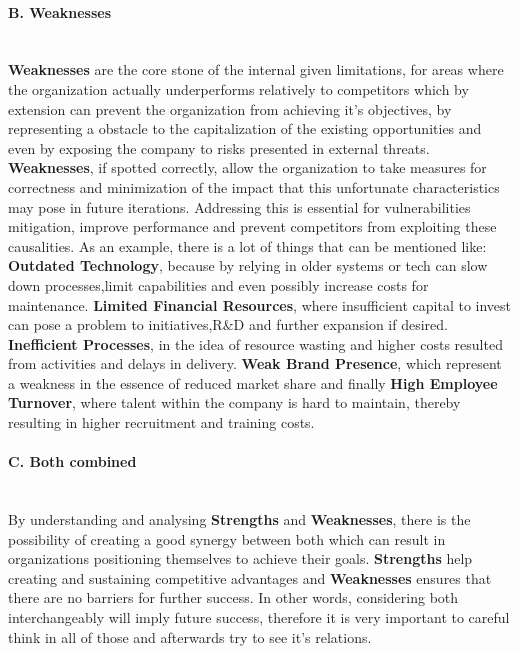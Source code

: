 \paragraph{B. Weaknesses}\mbox{}\\
\textbf{Weaknesses} are the core stone of the internal given limitations, for areas where the organization actually underperforms 
relatively to competitors which by extension can prevent the organization from achieving it's objectives, by representing a obstacle to 
the capitalization of the existing opportunities and even  by exposing the company to risks presented in external threats. \textbf{Weaknesses}, 
if spotted correctly, allow the organization to take measures for correctness and minimization of the impact that this unfortunate 
characteristics may pose in future iterations. Addressing this is essential for vulnerabilities mitigation, improve performance and 
prevent competitors from exploiting these causalities.
As an example, there is a lot of things that can be mentioned like: \textbf{Outdated Technology}, because by relying in older systems 
or tech can slow down processes,limit capabilities and even possibly increase costs for maintenance. \textbf{Limited Financial Resources}, 
where insufficient capital to invest can pose a problem to initiatives,R\&D and further expansion if desired. \textbf{Inefficient Processes}, 
in the idea of resource wasting and higher costs resulted from activities and delays in delivery. \textbf{Weak Brand Presence}, which 
represent a weakness in the essence of reduced market share and finally \textbf{High Employee Turnover}, where talent within the company 
is hard to maintain, thereby resulting in higher recruitment and training costs.

\paragraph{C. Both combined}\mbox{}\\
By understanding and analysing \textbf{Strengths} and \textbf{Weaknesses}, there is the possibility of creating a good synergy between 
both which can result in organizations positioning themselves to achieve their goals. \textbf{Strengths} help creating and sustaining 
competitive advantages and \textbf{Weaknesses} ensures that there are no barriers for further success. In other words, considering both 
interchangeably will imply future success, therefore it is very important to careful think in all of those and afterwards try to see it's 
relations.


